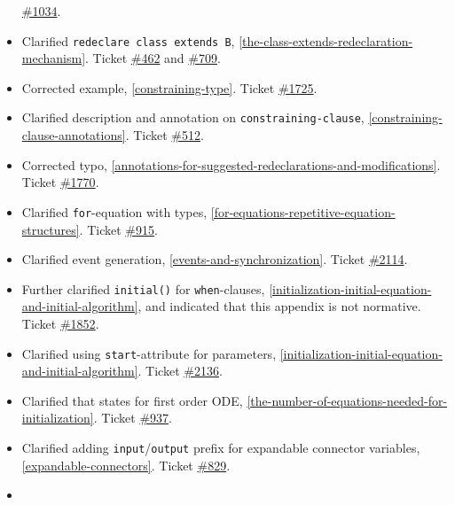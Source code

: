 \begin{itemize}
  \href{https://github.com/modelica/ModelicaSpecification/issues/1034}{\#1034}.
\item
  Clarified \lstinline!redeclare class extends B!, \cref{the-class-extends-redeclaration-mechanism}. Ticket
  \href{https://github.com/modelica/ModelicaSpecification/issues/462}{\#462} and
  \href{https://github.com/modelica/ModelicaSpecification/issues/709}{\#709}.
\item
  Corrected example, \cref{constraining-type}. Ticket
  \href{https://github.com/modelica/ModelicaSpecification/issues/1725}{\#1725}.
\item
  Clarified description and annotation on \lstinline[language=grammar]!constraining-clause!, \cref{constraining-clause-annotations}. Ticket
  \href{https://github.com/modelica/ModelicaSpecification/issues/512}{\#512}.
\item
  Corrected typo, \cref{annotations-for-suggested-redeclarations-and-modifications}. Ticket
  \href{https://github.com/modelica/ModelicaSpecification/issues/1770}{\#1770}.
\item
  Clarified \lstinline!for!-equation with types, \cref{for-equations-repetitive-equation-structures}.
  Ticket \href{https://github.com/modelica/ModelicaSpecification/issues/915}{\#915}.
\item
  Clarified event generation, \cref{events-and-synchronization}. Ticket
  \href{https://github.com/modelica/ModelicaSpecification/issues/2114}{\#2114}.
\item
  Further clarified \lstinline!initial()! for \lstinline!when!-clauses, \cref{initialization-initial-equation-and-initial-algorithm}, and indicated that this appendix is not normative.
  Ticket \href{https://github.com/modelica/ModelicaSpecification/issues/1852}{\#1852}.
\item
  Clarified using \lstinline!start!-attribute for parameters, \cref{initialization-initial-equation-and-initial-algorithm}. Ticket
  \href{https://github.com/modelica/ModelicaSpecification/issues/2136}{\#2136}.
\item
  Clarified that states for first order ODE, \cref{the-number-of-equations-needed-for-initialization}. Ticket
  \href{https://github.com/modelica/ModelicaSpecification/issues/937}{\#937}.
\item
  Clarified adding \lstinline!input!/\lstinline!output! prefix for expandable connector variables, \cref{expandable-connectors}.
  Ticket \href{https://github.com/modelica/ModelicaSpecification/issues/829}{\#829}.
\item

\end{itemize}
